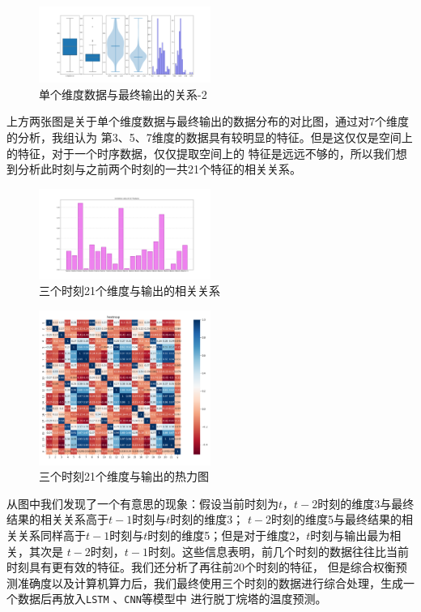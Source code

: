 \documentclass[11pt,a4paper]{elegantpaper}
\begin{document}
\begin{multicols}{2}
\begin{figure}[H]
  \centering
  \includegraphics[width=0.5\textwidth]{images/single_feature_1.png}
  \caption{单个维度数据与最终输出的关系-2} 
\end{figure}

上方两张图是关于单个维度数据与最终输出的数据分布的对比图，通过对7个维度的分析，我组认为
第3、5、7维度的数据具有较明显的特征。但是这仅仅是空间上的特征，对于一个时序数据，仅仅提取空间上的
特征是远远不够的，所以我们想到分析此时刻与之前两个时刻的一共21个特征的相关关系。

\begin{figure}[H]
  \centering
  \includegraphics[width=0.5\textwidth]{images/CORR.png}
  \caption{三个时刻21个维度与输出的相关关系} 
\end{figure}

\begin{figure}[H]
  \centering
  \includegraphics[width=0.5\textwidth]{images/HEAT.png}
  \caption{三个时刻21个维度与输出的热力图} 
\end{figure}

从图中我们发现了一个有意思的现象：假设当前时刻为$t$，$t-2$时刻的维度3与最终结果的相关关系高于$t-1$时刻与$t$时刻的维度3；
$t-2$时刻的维度5与最终结果的相关关系同样高于$t-1$时刻与$t$时刻的维度5；但是对于维度2，$t$时刻与输出最为相关，其次是
$t-2$时刻，$t-1$时刻。这些信息表明，前几个时刻的数据往往比当前时刻具有更有效的特征。我们还分析了再往前20个时刻的特征，
但是综合权衡预测准确度以及计算机算力后，我们最终使用三个时刻的数据进行综合处理，生成一个数据后再放入\lstinline{LSTM}
、\lstinline{CNN}等模型中
进行脱丁烷塔的温度预测。


\end{multicols}
\end{document}
